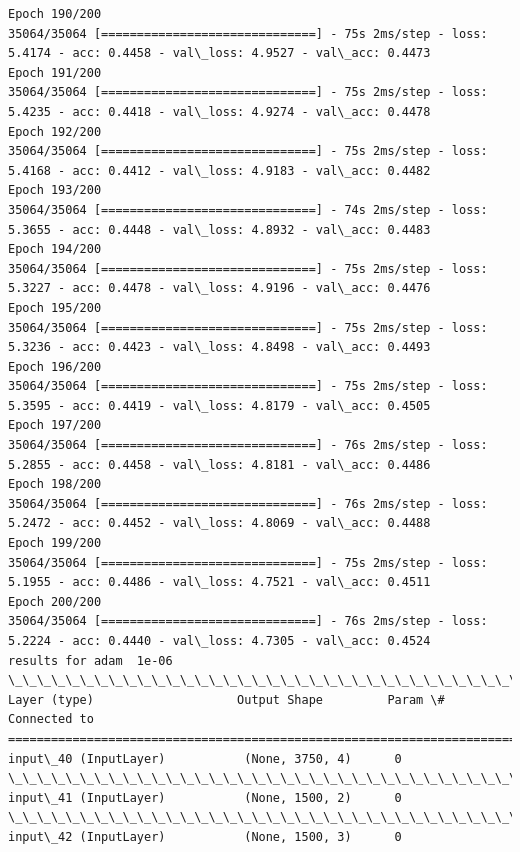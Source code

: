 \documentclass[11pt]{article}
\begin{document}
\begin{Verbatim}[commandchars=\\\{\}]
Epoch 190/200
35064/35064 [==============================] - 75s 2ms/step - loss: 5.4174 - acc: 0.4458 - val\_loss: 4.9527 - val\_acc: 0.4473
Epoch 191/200
35064/35064 [==============================] - 75s 2ms/step - loss: 5.4235 - acc: 0.4418 - val\_loss: 4.9274 - val\_acc: 0.4478
Epoch 192/200
35064/35064 [==============================] - 75s 2ms/step - loss: 5.4168 - acc: 0.4412 - val\_loss: 4.9183 - val\_acc: 0.4482
Epoch 193/200
35064/35064 [==============================] - 74s 2ms/step - loss: 5.3655 - acc: 0.4448 - val\_loss: 4.8932 - val\_acc: 0.4483
Epoch 194/200
35064/35064 [==============================] - 75s 2ms/step - loss: 5.3227 - acc: 0.4478 - val\_loss: 4.9196 - val\_acc: 0.4476
Epoch 195/200
35064/35064 [==============================] - 75s 2ms/step - loss: 5.3236 - acc: 0.4423 - val\_loss: 4.8498 - val\_acc: 0.4493
Epoch 196/200
35064/35064 [==============================] - 75s 2ms/step - loss: 5.3595 - acc: 0.4419 - val\_loss: 4.8179 - val\_acc: 0.4505
Epoch 197/200
35064/35064 [==============================] - 76s 2ms/step - loss: 5.2855 - acc: 0.4458 - val\_loss: 4.8181 - val\_acc: 0.4486
Epoch 198/200
35064/35064 [==============================] - 76s 2ms/step - loss: 5.2472 - acc: 0.4452 - val\_loss: 4.8069 - val\_acc: 0.4488
Epoch 199/200
35064/35064 [==============================] - 75s 2ms/step - loss: 5.1955 - acc: 0.4486 - val\_loss: 4.7521 - val\_acc: 0.4511
Epoch 200/200
35064/35064 [==============================] - 76s 2ms/step - loss: 5.2224 - acc: 0.4440 - val\_loss: 4.7305 - val\_acc: 0.4524
results for adam  1e-06
\_\_\_\_\_\_\_\_\_\_\_\_\_\_\_\_\_\_\_\_\_\_\_\_\_\_\_\_\_\_\_\_\_\_\_\_\_\_\_\_\_\_\_\_\_\_\_\_\_\_\_\_\_\_\_\_\_\_\_\_\_\_\_\_\_\_\_\_\_\_\_\_\_\_\_\_\_\_\_\_\_\_\_\_\_\_\_\_\_\_\_\_\_\_\_\_\_\_
Layer (type)                    Output Shape         Param \#     Connected to                     
==================================================================================================
input\_40 (InputLayer)           (None, 3750, 4)      0                                            
\_\_\_\_\_\_\_\_\_\_\_\_\_\_\_\_\_\_\_\_\_\_\_\_\_\_\_\_\_\_\_\_\_\_\_\_\_\_\_\_\_\_\_\_\_\_\_\_\_\_\_\_\_\_\_\_\_\_\_\_\_\_\_\_\_\_\_\_\_\_\_\_\_\_\_\_\_\_\_\_\_\_\_\_\_\_\_\_\_\_\_\_\_\_\_\_\_\_
input\_41 (InputLayer)           (None, 1500, 2)      0                                            
\_\_\_\_\_\_\_\_\_\_\_\_\_\_\_\_\_\_\_\_\_\_\_\_\_\_\_\_\_\_\_\_\_\_\_\_\_\_\_\_\_\_\_\_\_\_\_\_\_\_\_\_\_\_\_\_\_\_\_\_\_\_\_\_\_\_\_\_\_\_\_\_\_\_\_\_\_\_\_\_\_\_\_\_\_\_\_\_\_\_\_\_\_\_\_\_\_\_
input\_42 (InputLayer)           (None, 1500, 3)      0                                            

\end{Verbatim}
\end{document}
